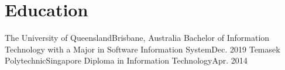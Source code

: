 \section{Education}
\resumeSubHeadingListStart
\resumeSubheading
{The University of Queensland}{Brisbane, Australia}
{Bachelor of Information Technology with a Major in Software Information System}{Dec. 2019}
\resumeSubheading
{Temasek Polytechnic}{Singapore}
{Diploma in Information Technology}{Apr. 2014}
\resumeSubHeadingListEnd